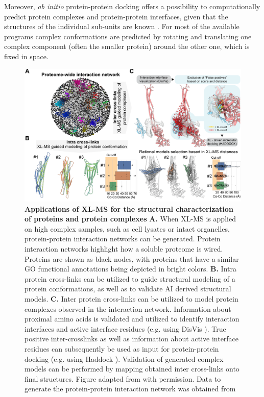 Moreover, \emph{ab initio} protein-protein docking offers a possibility to computationally predict protein complexes and protein-protein interfaces, given that the structures of the individual sub-units are known \cite{Dominguez_2003, Vakser_2014}. For most of the available programs complex
conformations are predicted by rotating and translating one complex component (often the smaller protein) around the other one, which is fixed in space.

\begin{figure}[htb]
    \center
    \includegraphics[]{Chapter.1/Figures/Figure4.png}
    \caption{\textbf{Applications of XL-MS for the structural characterization of proteins and protein complexes} \textbf{A.} When XL-MS is applied on high complex samples, such as cell lysates or intact organelles, protein-protein interaction networks can be generated. Protein interaction networks highlight how a soluble proteome is wired. Proteins are shown as black nodes, with proteins that have a similar GO functional annotations \cite{Ashburner_2000} being depicted in bright colors. \textbf{B.} Intra protein cross-links can be utilized to guide structural modeling of a protein conformations, as well as to validate AI derived structural models. \textbf{C.} Inter protein cross-links can be utilized to model protein complexes observed in the interaction network. Information about proximal amino acids is validated and utilized to identify interaction interfaces and active interface residues (e.g. using DisVis \cite{van_Zundert_2015}). True positive inter-crosslinks as well as information about active interface residues can subsequently be used as input for protein-protein docking (e.g. using Haddock \cite{van_Zundert_2016}). Validation of generated complex models can be performed by mapping obtained inter cross-links onto final structures. Figure adapted from \cite{Lagerwaard_2022} with permission. Data to generate the protein-protein interaction network was obtained from \cite{Costanzo_2016}}
    \label{fig:fig4}
\end{figure}\clearpage
